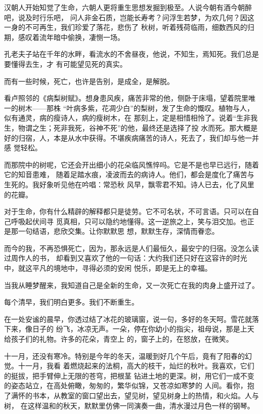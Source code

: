 		汉朝人开始知觉了生命，六朝人更将重生思想发掘到极至。人说今朝有酒今朝醉吧，说及时行乐吧，
	问人非金石质，岂能长寿考？问浮生若梦，为欢几何？因这一身的不可再生，我们珍爱了落花，悲伤了
	秋树，听着残荷临雨，细数西风的归期，感叹着流年暗中偷换，凄恻一场。

		孔老夫子站在千年的水畔，看流水的不舍昼夜，他说，不知生，焉知死。我们总是要懂得去生，才
	有可能望见死的真实。

		而有一些时候，死亡，也许是告别，是成全，是解脱。

		看卢照邻的《病梨树赋》。想身患风疾，痛苦非常的他，侧卧于床塌，望着院里唯一的树木——那株
	“叶病多紫，花凋少白”的梨树，发了生命的慨叹。植物与人，似有通灵，病的瘦诗人，病的瘦树木，在
	那刻上，定是相惜相怜了。说着“生非我生，物谓之生；死非我死，谷神不死”的他，最终还是选择了投
	水而死。那大概是好的归宿，人，本是从水中获得。不堪疾病痛苦的诗人，死去了，我们却与他一并感
	觉轻松。

		而那院中的树呢，它还会开出细小的花朵临风憔悴吗。它是不是也早已远行，随着它的知音患难，
	随着足踏水痕，凌波而去的病诗人。他们，都会是度化了痛苦与生死的。我好象听见他在吟唱：常恐秋
	风早，飘零君不知。诗人已去，化了风里的花瓣。

		对于生命，你有什么精辟的解释都只是徒劳。它不可名状，不可言语。只可以在自己呼吸起伏间寻
	觅真相，只可以隐约地懂得。这一逆旅之上，笑与泪交加。也正是那一句结语，悲欣交集。让你默默思
	想，默默生存，深情而眷恋。

		而今的我，不再恐惧死亡，因为，那永远是人们最恒久，最安宁的归宿。没怎么读过周作人的书，
	却看到又喜欢了他的一句话：大约我们还只好在这容许的时光中，就这平凡的境地中，寻得必须的安闲
	悦乐，即是无上的幸福。

		当我从睡梦醒来，我知道自己是全新的生命，又一次死亡在我的肉身上盛开过了。

		每个清早，我们明白更多。我们不断重生。

	\endwriting



		在一处安谧的晨早，你透过结了冰花的玻璃窗，说一句，多好的冬天呵。雪花就落下来，像日子的
	纷飞，冰凉无声。一朵，停在你幼小的指尖，祖母说，那是上天给孩子们的礼物。许多的花朵，青空上
	的，窗子上的，在怒放，在微笑。


		十一月，还没有寒冷。特别是今年的冬天，温暖到好几个午后，竟有了阳春的幻觉。十一月，我看
	着燃烧起来的法桐，高大的枝干，灿烂的秋叶。我喜欢，它们的挺拔，把手臂伸上无限的苍穹，把根茎
	钻进土地的更深。树，用它们一成不变的姿态站立，在高处俯瞰，匆匆的，繁华似锦，又苍凉如寒梦的
	人间。看你，抱了满怀的书本，从教室的窗口望出去，望见树，望见树身上的热情，和火焰。人与树，
	在这样温和的秋天，默默里仿佛一同演奏一曲，清水漫过月色一样的钢琴。


